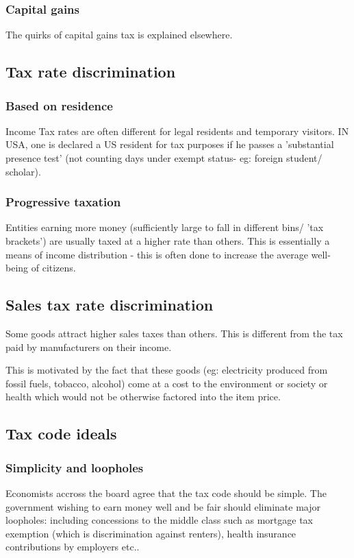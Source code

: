\documentclass[oneside, article]{memoir}
\begin{document}
\subsubsection{Capital gains}
The quirks of capital gains tax is explained elsewhere.

\subsection{Tax rate discrimination}
\subsubsection{Based on residence}
Income Tax rates are often different for legal residents and temporary visitors. IN USA, one is declared a US resident for tax purposes if he passes a 'substantial presence test' (not counting days under exempt status- eg: foreign student/ scholar).

\subsubsection{Progressive taxation}
Entities earning more money (sufficiently large to fall in different bins/ 'tax brackets') are usually taxed at a higher rate than others. This is essentially a means of income distribution - this is often done to increase the average well-being of citizens.

\subsection{Sales tax rate discrimination}
Some goods attract higher sales taxes than others. This is different from the tax paid by manufacturers on their income.

This is motivated by the fact that these goods (eg: electricity produced from fossil fuels, tobacco, alcohol) come at a cost to the environment or society or health which would not be otherwise factored into the item price.

\subsection{Tax code ideals}
\subsubsection{Simplicity and loopholes}
Economists accross the board agree that the tax code should be simple. The government wishing to earn money well and be fair should eliminate major loopholes: including concessions to the middle class such as mortgage tax exemption (which is discrimination against renters), health insurance contributions by employers etc..
\end{document}
